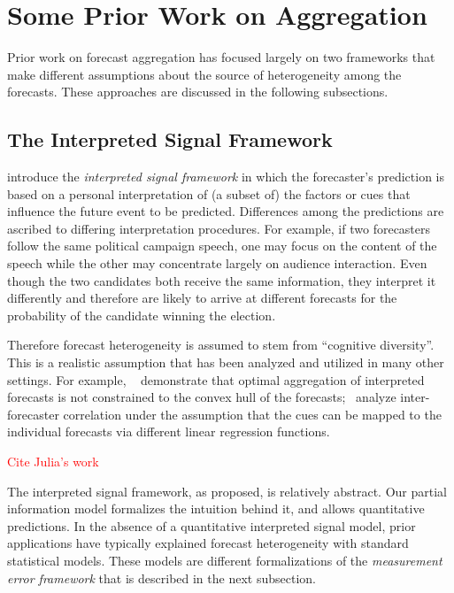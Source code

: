 \documentclass[11pt]{article}
\theoremstyle{definition}
\theoremstyle{definition}
\begin{document}
\section{Some Prior Work on Aggregation}
\label{sec:prior}
Prior work on forecast aggregation has focused largely on two frameworks that make different assumptions about the source of heterogeneity among the forecasts.  These approaches are discussed in the following
subsections.

\subsection{The Interpreted Signal Framework}
\label{ss:inerpreted}

\citet{hong2009interpreted} introduce the {\em interpreted signal
framework} in which the forecaster's prediction is based on a personal
interpretation of (a subset of) the factors or cues that influence the
future event to be predicted.  Differences among the 
predictions are ascribed to differing interpretation procedures.  For
example, if two forecasters follow the same political campaign speech,
one may focus on the content of the speech while the other may
concentrate largely on audience interaction.  Even though the two
candidates both receive the same information, they interpret it
differently and therefore are likely to arrive at different forecasts for the probability of the candidate winning the election.

Therefore forecast heterogeneity is assumed to stem from ``cognitive
diversity''.  This is a realistic assumption that has been analyzed and
utilized in many other settings.  For example,
~\citet{parunak2013characterizing} demonstrate that optimal
aggregation of interpreted forecasts is not constrained to the
convex hull of the forecasts;~\citet{broomell2009experts} analyze
inter-forecaster correlation under the assumption that the cues can be
mapped to the individual forecasts via different linear regression
functions.

\textcolor{red}{Cite Julia's work}


The interpreted signal framework, as proposed, is relatively abstract. 
Our partial information model formalizes the intuition behind it, and
allows quantitative predictions. In the absence of a quantitative
interpreted signal model, prior applications have typically explained forecast heterogeneity  with standard statistical models. These models are different formalizations of  the
\textit{measurement error framework} that is described in the next
subsection.
\end{document}
